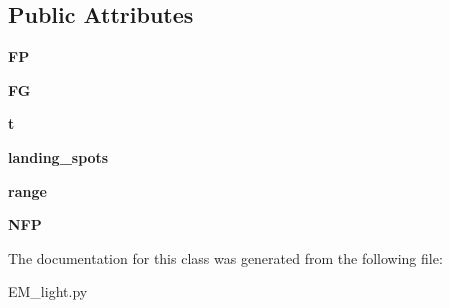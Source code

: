 \subsection*{Public Attributes}
\begin{DoxyCompactItemize}
\item 
{\bfseries FP}\hypertarget{classEM__light_1_1Actions_a9975d2120ecc427bc08b48f38fb251bc}{}\label{classEM__light_1_1Actions_a9975d2120ecc427bc08b48f38fb251bc}

\item 
{\bfseries FG}\hypertarget{classEM__light_1_1Actions_ada494517c00d6779f8213247d2ee6ec1}{}\label{classEM__light_1_1Actions_ada494517c00d6779f8213247d2ee6ec1}

\item 
{\bfseries t}\hypertarget{classEM__light_1_1Actions_ab4e77c22410c8cac3b3e121938ed3dbb}{}\label{classEM__light_1_1Actions_ab4e77c22410c8cac3b3e121938ed3dbb}

\item 
{\bfseries landing\+\_\+spots}\hypertarget{classEM__light_1_1Actions_a3a97f96d690284109548b6657b50cf48}{}\label{classEM__light_1_1Actions_a3a97f96d690284109548b6657b50cf48}

\item 
{\bfseries range}\hypertarget{classEM__light_1_1Actions_aeb8828616f45ed2e406b645a4463ec3f}{}\label{classEM__light_1_1Actions_aeb8828616f45ed2e406b645a4463ec3f}

\item 
{\bfseries N\+FP}\hypertarget{classEM__light_1_1Actions_a2cb6630277e3f55d6e16a13d5665cc15}{}\label{classEM__light_1_1Actions_a2cb6630277e3f55d6e16a13d5665cc15}

\end{DoxyCompactItemize}


The documentation for this class was generated from the following file\+:\begin{DoxyCompactItemize}
\item 
E\+M\+\_\+light.\+py\end{DoxyCompactItemize}
